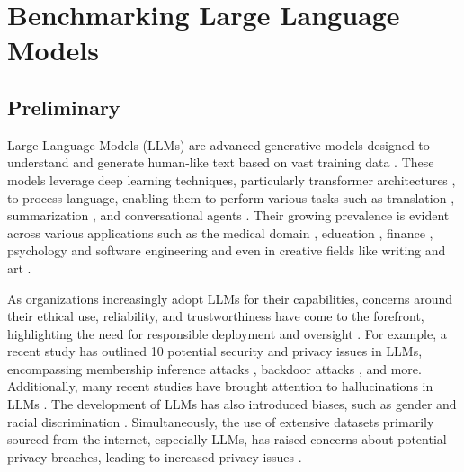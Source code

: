\newcommand{\xiangqi}[1]{{\small\color{brown}{\bf [Xiangqi: #1]}}}

\clearpage
\section{Benchmarking Large Language Models}
\label{sec:LLM}



\subsection{Preliminary}
Large Language Models (LLMs) are advanced generative models designed to understand and generate human-like text based on vast training data \cite{zhao2023survey}. These models leverage deep learning techniques, particularly transformer architectures \cite{vaswani2017attention}, to process language, enabling them to perform various tasks such as translation \cite{Zhang2023PromptingLL}, summarization \cite{summarization}, and conversational agents \cite{agentbench}. Their growing prevalence is evident across various applications such as the medical domain \cite{liu2023deidgpt}, education \cite{gan2023large}, finance \cite{kang2023deficiency}, psychology \cite{li2024think} and software engineering \cite{zhang2023survey} and even in creative fields like writing and art \cite{yuan2023artgpt}. 

As organizations increasingly adopt LLMs for their capabilities, concerns around their ethical use, reliability, and trustworthiness have come to the forefront, highlighting the need for responsible deployment and oversight \cite{wang2023decodingtrust, huang2024position}. For example, a recent study \cite{jia202310} has outlined 10 potential security and privacy issues in LLMs, encompassing membership inference attacks \cite{duan2024membership}, backdoor attacks \cite{shi2023badgpt, xu2023instructions, wang2023backdoor}, and more. Additionally, many recent studies have brought attention to hallucinations in LLMs \cite{kang2023deficiency, zhao2023hallucinations, zhang2023alleviating}. The development of LLMs has also introduced biases, such as gender and racial discrimination \cite{gender-bias, zhao2018gender, plazadelarco2024angrymen, wan2023kelly}. Simultaneously, the use of extensive datasets primarily sourced from the internet, especially LLMs, has raised concerns about potential privacy breaches, leading to increased privacy issues \cite{beyondmemorization, leakinginfo, probeprivacyleakage}. 

